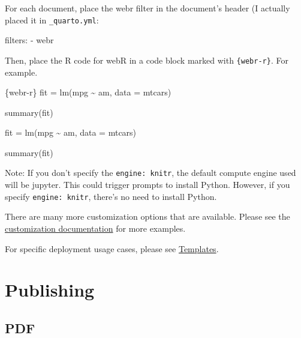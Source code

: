\documentclass[
  letterpaper,
  DIV=11,
  numbers=noendperiod]{scrreprt}
\newenvironment{Shaded}{\begin{snugshade}}{\end{snugshade}}
\newcommand{\AnnotationTok}[1]{\textcolor[rgb]{0.37,0.37,0.37}{#1}}
\newcommand{\InformationTok}[1]{\textcolor[rgb]{0.37,0.37,0.37}{#1}}
\newcommand{\NormalTok}[1]{\textcolor[rgb]{0.00,0.23,0.31}{#1}}
\newcommand{\SpecialStringTok}[1]{\textcolor[rgb]{0.13,0.47,0.30}{#1}}
\begin{document}
For each document, place the webr filter in the document's header (I
actually placed it in \texttt{\_quarto.yml}:

\begin{Shaded}
\begin{Highlighting}[]
\AnnotationTok{filters:}
\SpecialStringTok{  {-} }\NormalTok{webr}
\end{Highlighting}
\end{Shaded}

Then, place the R code for webR in a code block marked with
\texttt{\{webr-r\}}. For example.

\begin{Shaded}
\begin{Highlighting}[]
\InformationTok{\textasciigrave{}\textasciigrave{}\textasciigrave{}\{webr{-}r\}}
\InformationTok{fit = lm(mpg \textasciitilde{} am, data = mtcars)}

\InformationTok{summary(fit)}
\InformationTok{\textasciigrave{}\textasciigrave{}\textasciigrave{}}
\end{Highlighting}
\end{Shaded}

\begin{Shaded}
\begin{Highlighting}[]
\NormalTok{fit = lm(mpg \textasciitilde{} am, data = mtcars)}

\NormalTok{summary(fit)}
\end{Highlighting}
\end{Shaded}

Note: If you don't specify the \texttt{engine:\ knitr}, the default
compute engine used will be jupyter. This could trigger prompts to
install Python. However, if you specify \texttt{engine:\ knitr}, there's
no need to install Python.

There are many more customization options that are available. Please see
the
\href{https://quarto-webr.thecoatlessprofessor.com/qwebr-meta-options.html}{customization
documentation} for more examples.

For specific deployment usage cases, please see
\href{https://quarto-webr.thecoatlessprofessor.com/qwebr-deployment-templates.html}{Templates}.

\part{Publishing}

\chapter{PDF}\label{sec-pdf}
\end{document}
